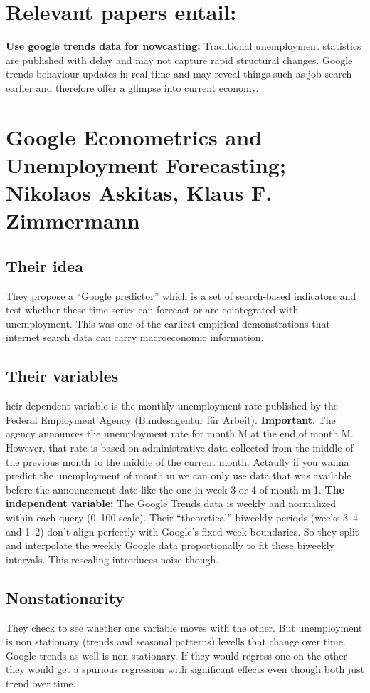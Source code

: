 \documentclass{article}
\begin{document}
\section{Relevant papers entail:}
\textbf{Use google trends data for nowcasting:}
Traditional unemployment statistics are published with delay and may not capture rapid structural changes. Google trends behaviour updates in real time and may reveal things such as job-search earlier and therefore offer a glimpse into current economy.
\section{Google Econometrics and Unemployment Forecasting; Nikolaos Askitas,
Klaus F. Zimmermann}

\subsection{Their idea}
They propose a “Google predictor” which is a set of search-based indicators and test whether these time series can forecast or are cointegrated with unemployment.
This was one of the earliest empirical demonstrations that internet search data can carry macroeconomic information.

\subsection{Their variables}
heir dependent variable is the monthly unemployment rate published by the Federal Employment Agency (Bundesagentur für Arbeit).
\textbf{Important}: The agency announces the unemployment rate for month M at the end of month M. However, that rate is based on administrative data collected from the middle of the previous month to the middle of the current month.
Actaully if you wanna predict the unemployment of month m we can only use data that was available before the announcement date like the one in week 3 or 4 of month m-1.
\textbf{The independent variable:} The Google Trends data is weekly and normalized within each query (0–100 scale).
Their “theoretical” biweekly periods (weeks 3–4 and 1–2) don’t align perfectly with Google’s fixed week boundaries.
So they split and interpolate the weekly Google data proportionally to fit these biweekly intervals. This rescaling introduces noise though.

\subsection{Nonstationarity}
They check to see whether one variable moves with the other. But unemployment is non stationary (trends and seasonal patterns) levells that change over time.
Google trends as well is non-stationary. If they would regress one on the other they would get a spurious regression with significant effects even though both just trend over time.
\end{document}
